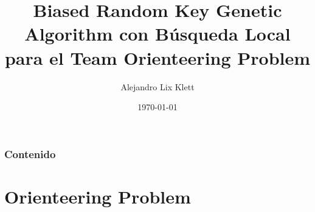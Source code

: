 \documentclass{beamer}
\title[BRKGA - BL - TOP]{Biased Random Key Genetic Algorithm con B\'usqueda Local para el Team Orienteering Problem} %
\author{Alejandro Lix Klett} %
\institute[UBA] %
{
Directora: Prof. Dra. Irene Loiseau\\ 
\medskip
Departamento de Computaci\'on\\ %
}
\date{\today} %
\begin{document}
\begin{frame}
\titlepage %
\end{frame}

\begin{frame}
\frametitle{Contenido} %
\tableofcontents %
\end{frame}


\section{Orienteering Problem} %

\end{document}

